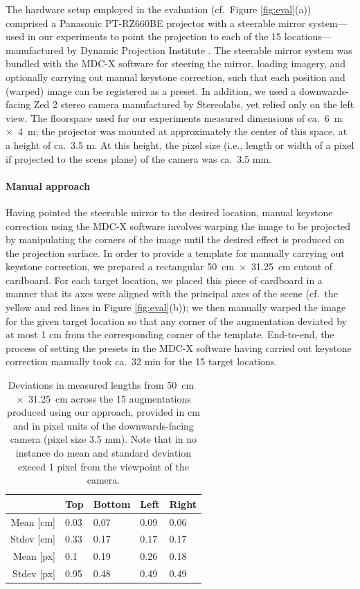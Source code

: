 \documentclass[review]{elsarticle}
\begin{document}
The hardware setup employed in the evaluation (cf.\ Figure \ref{fig:eval}(a)) comprised a Panasonic PT-RZ660BE projector with a steerable mirror system---used in our experiments to point the projection to each of the 15 locations---manufactured by Dynamic Projection Institute \cite{rupprecht2020information,Rupprecht2021}. The steerable mirror system was bundled with the MDC-X software for steering the mirror, loading imagery, and optionally carrying out manual keystone correction, such that each position and (warped) image can be registered as a preset. In addition, we used a downwards-facing Zed 2 stereo camera manufactured by Stereolabs, yet relied only on the left view. The floorspace used for our experiments measured dimensions of ca.\ 6~m~$\times$~4~m; the projector was mounted at approximately the center of this space, at a height of ca.\ 3.5 m. At this height, the pixel size (i.e., length or width of a pixel if projected to the scene plane) of the camera was ca.\ 3.5 mm.

\paragraph{Manual approach} Having pointed the steerable mirror to the desired location, manual keystone correction using the MDC-X software involves warping the image to be projected by manipulating the corners of the image until the desired effect is produced on the projection surface. In order to provide a template for manually carrying out keystone correction, we prepared a rectangular 50~cm~$\times$~31.25~cm cutout of cardboard. For each target location, we placed this piece of cardboard in a manner that its axes were aligned with the principal axes of the scene (cf.\ the yellow and red lines in Figure \ref{fig:eval}(b)); we then manually warped the image for the given target location so that any corner of the augmentation deviated by at most 1 cm from the corresponding corner of the template. End-to-end, the process of setting the presets in the MDC-X software having carried out keystone correction manually took ca.\ 32 min for the 15 target locations.

\begin{table}[ht]
\caption{Deviations in measured lengths from 50~cm~$\times$~31.25~cm across the 15 augmentations produced using our approach, provided in cm and in pixel units of the downwards-facing camera (pixel size 3.5 mm). Note that in no instance do mean and standard deviation exceed 1 pixel from the viewpoint of the camera.}
\label{table:length}
\centering
{\small
\begin{tabularx}{7.4cm}{r p{1cm} p{1cm} p{1cm} p{1cm}}
\toprule
  & Top & Bottom & Left & Right \\
\midrule
Mean {\tiny[cm]} & 0.03 & 0.07 & 0.09 & 0.06 \\
Stdev {\tiny[cm]} & 0.33 & 0.17 & 0.17 & 0.17 \\
\midrule
Mean {\tiny[px]} & 0.1 & 0.19 & 0.26 & 0.18 \\
Stdev {\tiny[px]} & 0.95 & 0.48 & 0.49 & 0.49 \\
\bottomrule
\end{tabularx}}
\end{table}
\end{document}
